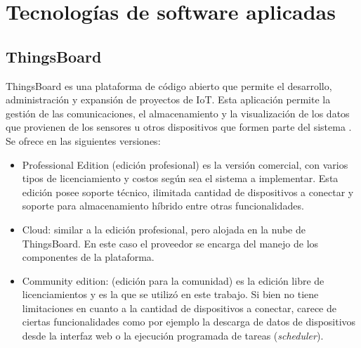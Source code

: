 \pagebreak
\section{Tecnologías de software aplicadas}
\label{sec:Software aplicado}
\subsection{ThingsBoard}
\label{sec:ThingsBoard}
ThingsBoard es una plataforma de código abierto que permite el desarrollo, administración y expansión de proyectos de IoT. Esta aplicación permite la gestión de las comunicaciones, el almacenamiento y la visualización de los datos que provienen de los sensores u otros dispositivos que formen parte del sistema \citep{thingsboard:1}.
Se ofrece en las siguientes versiones:
\begin{itemize}

\item Professional Edition (edición profesional) es la versión comercial, con varios tipos de licenciamiento y costos según sea el sistema a implementar. Esta edición posee soporte técnico, ilimitada cantidad de dispositivos a conectar y soporte para almacenamiento híbrido entre otras funcionalidades.

\item Cloud: similar a la edición profesional, pero alojada en la nube de ThingsBoard. En este caso el proveedor se encarga del manejo de los componentes de la plataforma.
 
\item Community edition: (edición para la comunidad) es la edición libre de licenciamientos y es la que se utilizó en este trabajo. Si bien no tiene limitaciones en cuanto a la cantidad de dispositivos a conectar, carece de ciertas funcionalidades como por ejemplo la descarga de datos de dispositivos desde la interfaz web o la ejecución programada de tareas (\textit{scheduler}).
\end{itemize}
%
%
%
